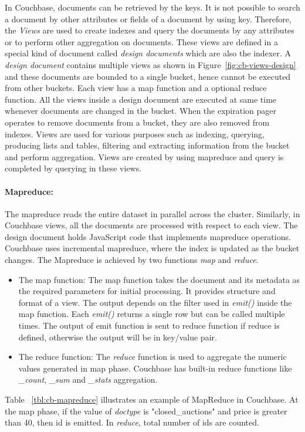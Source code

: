  In Couchbase, documents can be retrieved by the keys. It is not possible to search a document by other attributes or fields of a document by using key.  Therefore, the \textit{Views} are used to create indexes and query the documents by any attributes or to perform other aggregation on documents. These views are defined in a special kind of document called \textit{design documents} which are also the indexer. A \textit{design document} contains multiple views as shown in Figure~\ref{fig:cb-views-design} and these documents are bounded to a single bucket, hence cannot be executed from other buckets. Each view has a map function and a optional reduce function. All the views inside a design document are executed at same time whenever  documents are changed in the bucket. When the expiration pager operates to remove documents from a bucket, they are also removed from indexes. Views are used for various purposes such as indexing, querying, producing lists and tables, filtering and extracting information from the bucket and perform aggregation.  Views are created by using mapreduce and query is completed by querying in these views.
 
\paragraph{Mapreduce:} 
The mapreduce reads the entire dataset in parallel across the cluster. Similarly, in Couchbase views, all the documents are processed with respect to each view. The design document holds JavaScript code that implements mapreduce operations. Couchbase uses incremental mapreduce, where the index is updated as the bucket changes. The Mapreduce is achieved by two functions \textit{map} and \textit{reduce}. 
\begin{itemize}
\item {The map function:}
The map function takes the document and its metadata as the required parameters for initial processing. It provides structure and format of a view. The output depends on the filter used in \textit{emit()} inside  the map function. Each \textit{emit()}  returns a single row but can be called multiple times. The output of emit function is sent to reduce function if reduce is defined, otherwise the output will be in key/value pair. 

\item {The reduce function:}
The \textit{reduce} function is used to aggregate the numeric values generated in map phase. Couchbase has built-in reduce functions like \textit{\_count}, \textit{\_sum} and \textit{\_stats} aggregation.

\end{itemize}
Table ~\ref{tbl:cb-mapreduce} illustrates an example of MapReduce  in Couchbase. At the map phase, if the value of \textit{ doctype} is "closed\_auctions" and  price is greater than 40, then  id  is emitted. In \textit{reduce}, total number of ids are counted.

